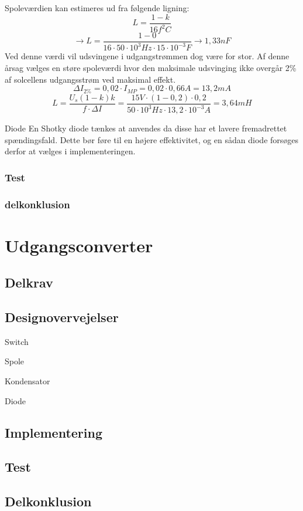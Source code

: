 \documentclass[../main.tex]{subfiles}
\begin{document}
            Spoleværdien kan estimeres ud fra følgende ligning:
            $$L = \frac{1-k}{16 f^2 C}$$
            $$\rightarrow L = \frac{1-0}{16\cdot 50\cdot 10^3 Hz \cdot 15\cdot 10^{-3}F} \rightarrow 1,33nF$$
            \newline
            Ved denne værdi vil udsvingene i udgangstrømmen dog være for stor. Af denne årsag vælges en støre spoleværdi hvor den maksimale udsvinging ikke overgår 2\% af solcellens udgangsstrøm ved maksimal effekt.
            $$\Delta I_{2\%} = 0,02 \cdot I_{MP} = 0,02 \cdot 0,66A = 13,2mA$$
            $$L = \frac{U_s(1-k)k}{f\cdot \Delta I} = \frac{15 V\cdot (1-0,2)\cdot 0,2}{50\cdot 10^3 Hz \cdot 13,2 \cdot 10^{-3} A} = 3,64mH$$\newline
            
            
            Diode
            En Shotky diode tænkes at anvendes da disse har et lavere fremadrettet spændingsfald. Dette bør føre til en højere effektivitet, og en sådan diode forsøges derfor at vælges i implementeringen.
            
            
        \subsubsection{Test}
            
            
            
            
        \subsubsection{delkonklusion}
            
            

                    
\section{Udgangsconverter}
        
    \subsection{Delkrav}
        
    \subsection{Designovervejelser}
            
            Switch

            Spole

            Kondensator

            Diode


            
    \subsection{Implementering}
        
    \subsection{Test}
        
    \subsection{Delkonklusion}
        
        
\end{document}
